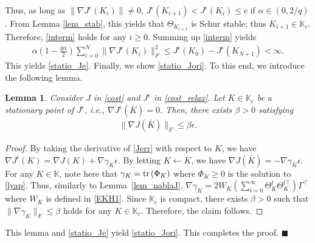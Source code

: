 \documentclass[preprint,5p,times,twocolumn]{elsarticle}
\newtheorem{lem}{Lemma}
\def\tr{{\rm tr} \hspace{0.5mm}}
\def\qed{\hfill $\blacksquare$}
\begin{document}
Thus, as long as $\|\nabla J^{\epsilon}(K_i)\| \not=0$, $J^{\epsilon}(K_{i+1}) < J^{\epsilon}(K_i) \leq c$ if $\alpha \in (0, 2/q)$. From Lemma \ref{lem_stab}, this yields that $\Theta_{K_{i+1}}$ is Schur stable; thus $K_{i+1} \in \mathbb K_c$. Therefore, \eqref{interm} holds for any $i \geq 0$. Summing up \eqref{interm} yields 
\begin{align}
    \alpha\left(1 - \frac{q\alpha}{2}\right) \sum_{i=0}^N\|\nabla J^{\epsilon}(K_i)\|_F^2 \leq J^{\epsilon}(K_0) - J^{\epsilon}(K_{N+1}) < \infty. \nonumber
\end{align}
This yields \eqref{statio_Je}. Finally, we show \eqref{statio_Jori}. To this end, we introduce the following lemma. 
\begin{lem}\label{lem_stationary}
    Consider $J$ in \eqref{cost} and $J^{\epsilon}$ in \eqref{cost_relax}. Let $\overline{K} \in \mathbb K_c$ be a stationary point of $J^{\epsilon}$, i.e., $\nabla J^{\epsilon}(\overline{K}) = 0$. Then, there exists $\beta > 0$ satisfying 
    \begin{align}\label{eps_stationary}
        \|\nabla J(\overline{K})\|_F \leq \beta {\epsilon}.
    \end{align}
\end{lem}
\begin{proof}
By taking the derivative of \eqref{Jerr} with respect to $K$, we have $\nabla J^{\epsilon}(K) = \nabla J(K) + \nabla \gamma_K{\epsilon}$. By letting $K \leftarrow \overline{K}$, we have $\nabla J(\overline{K}) = -\nabla \gamma_{\overline{K}}{\epsilon}$. For any $K \in \mathbb K$, note here that $\gamma_K = \tr(\Phi_K)$ where $\Phi_K \geq 0$ is the solution to \eqref{lyap}. Thus, similarly to Lemma~\ref{lem_nablaJ}, $\nabla \gamma_K = 2W_K(\sum_{t=0}^{\infty}\Theta_K^t \Theta_K^{t\top})\Gamma^{\top}$ where $W_K$ is defined in \eqref{EKH1}. Since $\mathbb K_c$ is compact, there exists $\beta > 0$ such that $\|\nabla \gamma_{K}\|_F \leq \beta $ holds for any $K \in \mathbb K_c$. Therefore, the claim follows.  
\end{proof}
This lemma and \eqref{statio_Je} yield \eqref{statio_Jori}. This completes the proof. \qed



\end{document}
